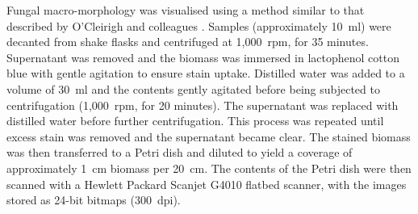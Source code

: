 Fungal macro-morphology was visualised using a method similar to that described by O'Cleirigh and colleagues \cite{ocleirigh2003}. Samples (approximately 10~ml) were decanted from shake flasks and centrifuged at 1,000~rpm,  for 35 minutes. Supernatant was removed and the biomass was immersed in lactophenol cotton blue with gentle agitation to ensure stain uptake. Distilled water was added to a volume of 30~ml and the contents gently agitated before being subjected to centrifugation (1,000~rpm,  for 20 minutes). The supernatant was replaced with distilled water before further centrifugation. This process was repeated until excess stain was removed and the supernatant became clear. The stained biomass was then transferred to a Petri dish and diluted to yield a coverage of approximately 1~cm biomass per 20~cm. The contents of the Petri dish were then scanned with a Hewlett Packard Scanjet G4010 flatbed scanner, with the images stored as 24-bit bitmaps (300~dpi).